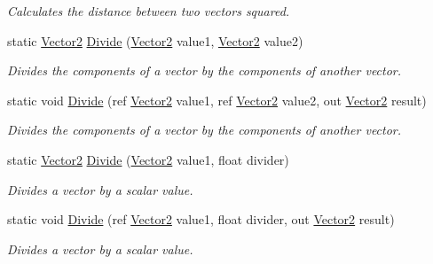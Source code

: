 \begin{DoxyCompactItemize}
\begin{DoxyCompactList}\small\item\em Calculates the distance between two vectors squared.\end{DoxyCompactList}\item 
static \hyperlink{structMicrosoft_1_1Xna_1_1Framework_1_1Vector2}{Vector2} \hyperlink{structMicrosoft_1_1Xna_1_1Framework_1_1Vector2_aa2ec781f61c1cc4da672c1ec72ea9f2c}{Divide} (\hyperlink{structMicrosoft_1_1Xna_1_1Framework_1_1Vector2}{Vector2} value1, \hyperlink{structMicrosoft_1_1Xna_1_1Framework_1_1Vector2}{Vector2} value2)
\begin{DoxyCompactList}\small\item\em Divides the components of a vector by the components of another vector.\end{DoxyCompactList}\item 
static void \hyperlink{structMicrosoft_1_1Xna_1_1Framework_1_1Vector2_a0aeb9c8247e61be42f7f1d681fa7e612}{Divide} (ref \hyperlink{structMicrosoft_1_1Xna_1_1Framework_1_1Vector2}{Vector2} value1, ref \hyperlink{structMicrosoft_1_1Xna_1_1Framework_1_1Vector2}{Vector2} value2, out \hyperlink{structMicrosoft_1_1Xna_1_1Framework_1_1Vector2}{Vector2} result)
\begin{DoxyCompactList}\small\item\em Divides the components of a vector by the components of another vector.\end{DoxyCompactList}\item 
static \hyperlink{structMicrosoft_1_1Xna_1_1Framework_1_1Vector2}{Vector2} \hyperlink{structMicrosoft_1_1Xna_1_1Framework_1_1Vector2_aa4a54ef330c3b1913d5898e8b5a62ef9}{Divide} (\hyperlink{structMicrosoft_1_1Xna_1_1Framework_1_1Vector2}{Vector2} value1, float divider)
\begin{DoxyCompactList}\small\item\em Divides a vector by a scalar value.\end{DoxyCompactList}\item 
static void \hyperlink{structMicrosoft_1_1Xna_1_1Framework_1_1Vector2_a20121aeb5450d345245ac6a8f5181ad2}{Divide} (ref \hyperlink{structMicrosoft_1_1Xna_1_1Framework_1_1Vector2}{Vector2} value1, float divider, out \hyperlink{structMicrosoft_1_1Xna_1_1Framework_1_1Vector2}{Vector2} result)
\begin{DoxyCompactList}\small\item\em Divides a vector by a scalar value.\end{DoxyCompactList}\item 

\end{DoxyCompactItemize}
